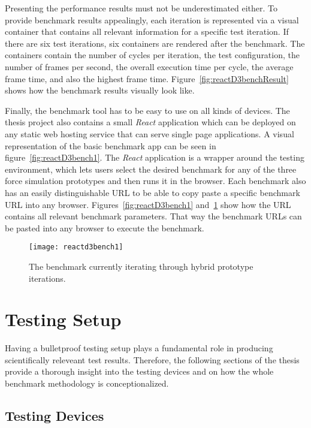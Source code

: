 Presenting the performance results must not be underestimated either. To provide benchmark results appealingly, each iteration is represented via a visual container that contains all relevant information for a specific test iteration. If there are six test iterations, six containers are rendered after the benchmark. The containers contain the number of cycles per iteration, the test configuration, the number of frames per second, the overall execution time per cycle, the average frame time, and also the highest frame time. Figure~\ref{fig:reactD3benchResult} shows how the benchmark results visually look like.

Finally, the benchmark tool has to be easy to use on all kinds of devices. The thesis project also contains a small \emph{React} application which can be deployed on any static web hosting service that can serve single page applications. A visual representation of the basic benchmark app can be seen in figure~\ref{fig:reactD3bench1}. The \emph{React} application is a wrapper around the testing environment, which lets users select the desired benchmark for any of the three force simulation prototypes and then runs it in the browser. Each benchmark also has an easily distinguishable URL to be able to copy paste a specific benchmark URL into any browser. Figures~\ref{fig:reactD3bench1} and~\ref{fig:reactD3bench2} show how the URL contains all relevant benchmark parameters. That way the benchmark URLs can be pasted into any browser to execute the benchmark. 

\begin{figure}
  \centering
  \texttt{[image: reactd3bench1]}
  \caption{The benchmark currently iterating through hybrid prototype iterations.}
  \label{fig:reactD3bench2}
\end{figure}

\section{Testing Setup}

Having a bulletproof testing setup plays a fundamental role in producing scientifically releveant test results. Therefore, the following sections of the thesis provide a thorough insight into the testing devices and on how the whole benchmark methodology is conceptionalized. 

\subsection{Testing Devices}

